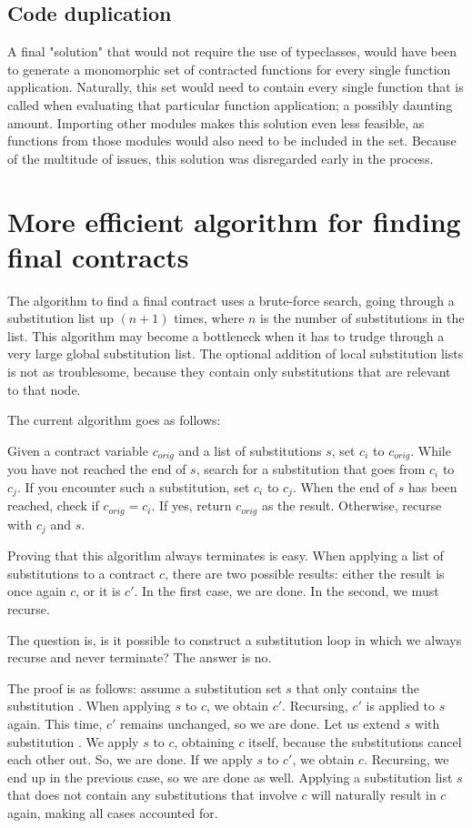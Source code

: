 \documentclass[10pt]{report}
\newcommand{\code}[1]{%
  {%
   \setlength{\fboxsep}{-2\fboxrule}%
   \fcolorbox{black}{light-gray}{\hspace{1.5pt}\strut\texttt{#1}\hspace{1.5pt}}%
  }%
}
\begin{document}
{\subsection{Code duplication}

A final "solution" that would not require the use of typeclasses, would have been to generate a monomorphic set of contracted functions for every single function application.
Naturally, this set would need to contain every single function that is called when evaluating that particular function application; a possibly daunting amount.
Importing other modules makes this solution even less feasible, as functions from those modules would also need to be included in the set.
Because of the multitude of issues, this solution was disregarded early in the process.

\section{More efficient algorithm for finding final contracts}
\label{futurework:efficientsubstalgo}

The algorithm to find a final contract uses a brute-force search, going through a substitution list up $(n+1)$ times, where $n$ is the number of substitutions in the list. 
This algorithm may become a bottleneck when it has to trudge through a very large global substitution list.
The optional addition of local substitution lists is not as troublesome, because they contain only substitutions that are relevant to that node.

The current algorithm goes as follows:

Given a contract variable $c_{orig}$ and a list of substitutions $s$, set $c_i$ to $c_{orig}$.
While you have not reached the end of $s$, search for a substitution that goes from $c_i$ to $c_j$.
If you encounter such a substitution, set $c_i$ to $c_j$.
When the end of $s$ has been reached, check if $c_{orig} = c_i$.
If yes, return $c_{orig}$ as the result.
Otherwise, recurse with $c_j$ and $s$.

Proving that this algorithm always terminates is easy.
When applying a list of substitutions to a contract $c$, there are two possible results: either the result is once again $c$, or it is $c'$.
In the first case, we are done.
In the second, we must recurse.

The question is, is it possible to construct a substitution loop in which we always recurse and never terminate?
The answer is no.

The proof is as follows:
assume a substitution set $s$ that only contains the substitution \code{c $\mapsto$ c$'$}.
When applying $s$ to $c$, we obtain $c'$.
Recursing, $c'$ is applied to $s$ again.
This time, $c'$ remains unchanged, so we are done.
Let us extend $s$ with substitution \code{c$'$ $\mapsto$ c}.
We apply $s$ to $c$, obtaining $c$ itself, because the substitutions cancel each other out.
So, we are done.
If we apply $s$ to $c'$, we obtain $c$.
Recursing, we end up in the previous case, so we are done as well.
Applying a substitution list $s$ that does not contain any substitutions that involve $c$ will naturally result in $c$ again, making all cases accounted for.

}
\end{document}
